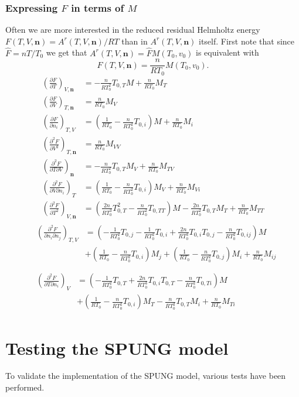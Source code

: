\documentclass[internal,english]{sintefmemo2012}
\newcommand{\mbn}[0]{\mathbf n}
\newcommand*{\pdersub}[3]{\left(\frac{\partial #1}{\partial #2}\right)_{#3}}
\newcommand*{\pddersub}[3]{\left(\frac{\partial^2 #1}{\partial #2^2}\right)_{#3}}
\newcommand*{\pdcrosssub}[4]{\left(\frac{\partial^2 #1}{\partial #2 \partial #3}\right)_{#4}}
\newcommand*{\hF}[0]{\hat F}
\newcommand{\lp}{\left(}
\newcommand{\rp}{\right)}
\numberwithin{equation}{section}
\begin{document}
\subsubsection*{Expressing $F$ in terms of $M$}
Often we are more interested in the reduced residual Helmholtz energy
$F(T,V,\mbn) = A^r(T,V,\mbn)/RT$ than in $A^r(T,V,\mbn)$ itself. First
note that since $\hF = nT/T_0$ we get that $A^r(T,V,\mbn) = \hF
M(T_0,v_0)$ is equivalent with
$$
F(T,V,\mbn) = \frac{n}{RT_0} M(T_0,v_0).
$$
\begin{align}
  \pdersub{F}{T}{V,\mbn} &= -\frac{n}{RT_0^2} T_{0,T} M +\frac{n}{RT_0} M_T \\
  \pdersub{F}{V}{T,\mbn} &= \frac{n}{RT_0} M_V \\
  \pdersub{F}{n_i}{T,V} &= \lp \frac{1}{RT_0} - \frac{n}{RT_0^2} T_{0,i} \rp M + \frac{n}{RT_0} M_i \\
  \pddersub{F}{V}{T,\mbn} &= \frac{n}{RT_0} M_{VV} \\
  \pdcrosssub{F}{T}{V}{\mbn} &= -\frac{n}{RT_0^2} T_{0,T} M_V +\frac{n}{RT_0} M_{TV} \\
  \pdcrosssub{F}{V}{n_i}{T} &= \lp \frac{1}{RT_0} - \frac{n}{RT_0^2} T_{0,i} \rp M_V + \frac{n}{RT_0} M_{Vi} \\
  \pddersub{F}{T}{V,\mbn} &= \lp \frac{2n}{RT_0^3} T_{0,T}^2 -
  \frac{n}{RT_0^2} T_{0,TT} \rp M - \frac{2n}{RT_0^2} T_{0,T} M_T +
  \frac{n}{RT_0} M_{TT}
\end{align}
\begin{align}
  &\begin{aligned}
    \pdcrosssub{F}{n_i}{n_j}{T,V} &= \lp -\frac{1}{RT_0^2} T_{0,j} - \frac{1}{RT_0^2} T_{0,i} + \frac{2n}{RT_0^3} T_{0,i} T_{0,j} - \frac{n}{RT_0^2} T_{0,ij} \rp M \\
    &+ \lp \frac{1}{RT_0} - \frac{n}{RT_0^2} T_{0,i} \rp M_j + \lp \frac{1}{RT_0} - \frac{n}{RT_0^2} T_{0,j} \rp M_i + \frac{n}{RT_0} M_{ij} \\
  \end{aligned} \\
  &\begin{aligned}
    \pdcrosssub{F}{T}{n_i}{V} &= \lp -\frac{1}{RT_0^2} T_{0,T} + \frac{2n}{RT_0^3} T_{0,i} T_{0,T} - \frac{n}{RT_0^2} T_{0,Ti} \rp M \\
    &+ \lp \frac{1}{RT_0} - \frac{n}{RT_0^2} T_{0,i} \rp M_T -
    \frac{n}{RT_0^2} T_{0,T} M_i + \frac{n}{RT_0} M_{Ti}
  \end{aligned}
\end{align}

\section{Testing the SPUNG model}
To validate the implementation of the SPUNG model, various tests have
been performed.
\end{document}
